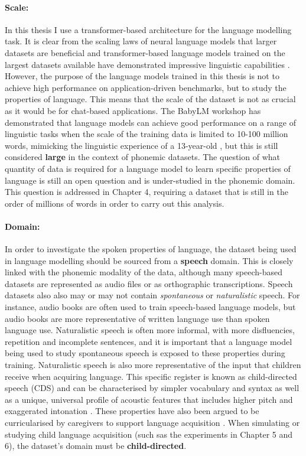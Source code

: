 \paragraph{Scale:} In this thesis I use a transformer-based architecture for the language modelling task. It is clear from the scaling laws of neural language models that larger datasets are beneficial \citep{bansal-2022-datascaling} and transformer-based language models trained on the largest datasets available have demonstrated impressive linguistic capabilities \rough{[citations]}. However, the purpose of the language models trained in this thesis is not to achieve high performance on application-driven benchmarks, but to study the properties of language. This means that the scale of the dataset is not as crucial as it would be for chat-based applications. The BabyLM workshop has demonstrated that language models can achieve good performance on a range of linguistic tasks when the scale of the training data is limited to 10-100 million words, mimicking the linguistic experience of a 13-year-old \citep{warstadt-2023-babylm-findings}, but this is still considered \textbf{large} in the context of phonemic datasets. The question of what quantity of data is required for a language model to learn specific properties of language is still an open question and is under-studied in the phonemic domain. This question is addressed in Chapter 4, requiring a dataset that is still in the order of millions of words in order to carry out this analysis.

\paragraph{Domain:} In order to investigate the spoken properties of language, the dataset being used in language modelling should be sourced from a \textbf{speech} domain. This is closely linked with the phonemic modality of the data, although many speech-based datasets are represented as audio files or as orthographic transcriptions. Speech datasets also also may or may not contain \textit{spontaneous} or \textit{naturalistic} speech. For instance, audio books are often used to train speech-based language models, but audio books are more representative of written language use than spoken language use. Naturalistic speech is often more informal, with more disfluencies, repetition and incomplete sentences, and it is important that a language model being used to study spontaneous speech is exposed to these properties during training. Naturalistic speech is also more representative of the input that children receive when acquiring language. This specific register is known as child-directed speech (CDS) and can be characterised by simpler vocabulary and syntax \citep{rowe2008child, faulkner2003construction, snow1977talking, van1977some} as well as a unique, universal profile of acoustic features that includes higher pitch and exaggerated intonation \citep{hilton2022acoustic}. These properties have also been argued to be curricularised by caregivers to support language acquisition \citep{gleitman1972mother, newport1990maturational}. When simulating or studying child language acquisition (such sas the experiments in Chapter 5 and 6), the dataset's domain must be \textbf{child-directed}.


